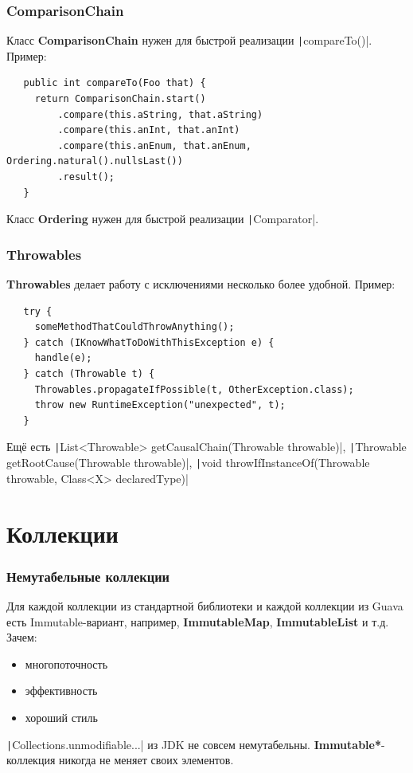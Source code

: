 \documentclass[xetex,mathserif,serif]{beamer}
\begin{document}
	\begin{frame}[fragile]
		\frametitle{ComparisonChain}
		Класс \textbf{ComparisonChain} нужен для быстрой реализации \texttt|compareTo()|. Пример:
		
		\begin{verbatim}
   public int compareTo(Foo that) {
     return ComparisonChain.start()
         .compare(this.aString, that.aString)
         .compare(this.anInt, that.anInt)
         .compare(this.anEnum, that.anEnum, Ordering.natural().nullsLast())
         .result();
   }
		\end{verbatim}

		Класс \textbf{Ordering} нужен для быстрой реализации \texttt|Comparator|.
\end{frame}

	\begin{frame}[fragile]
		\frametitle{Throwables}
		\textbf{Throwables} делает работу с исключениями несколько более удобной. Пример:

		\begin{verbatim}
   try {
     someMethodThatCouldThrowAnything();
   } catch (IKnowWhatToDoWithThisException e) {
     handle(e);
   } catch (Throwable t) {
     Throwables.propagateIfPossible(t, OtherException.class);
     throw new RuntimeException("unexpected", t);
   }
		\end{verbatim}

		\begin{scriptsize}
			Ещё есть \texttt|List<Throwable> getCausalChain(Throwable throwable)|, \texttt|Throwable getRootCause(Throwable throwable)|, \texttt|void throwIfInstanceOf(Throwable throwable, Class<X> declaredType)|
		\end{scriptsize}
\end{frame}

 	\section{Коллекции}

	\begin{frame}
		\frametitle{Немутабельные коллекции}
		Для каждой коллекции из стандартной библиотеки и каждой коллекции из Guava есть Immutable-вариант, например, \textbf{ImmutableMap}, \textbf{ImmutableList} и т.д. Зачем:
		\begin{itemize}
			\item многопоточность
			\item эффективность
			\item хороший стиль
		\end{itemize}
		\texttt|Collections.unmodifiable...| из JDK не совсем немутабельны. \textbf{Immutable*}-коллекция никогда не меняет своих элементов.
	\end{frame}
\end{document}
